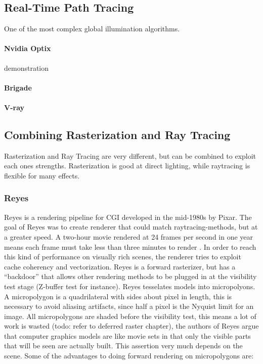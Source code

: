 \subsection {Real-Time Path Tracing}
	One of the most complex global illumination algorithms. 
	\paragraph {Nvidia Optix} demonstration
	\paragraph {Brigade} 
	\paragraph {V-ray}

\subsection {Combining Rasterization and Ray Tracing}
	Rasterization and Ray Tracing are very different, but can be combined to exploit each ones strengths. Rasterization is good at direct lighting, while raytracing is flexible for many effects.

\subsubsection {Reyes}
	\def\onequarter{\sfrac{1}{4}}
  \def\onehalf{\sfrac{1}{2}}
  
	Reyes is a rendering pipeline for CGI developed in the mid-1980s by Pixar. The goal of Reyes was to create renderer that could match raytracing-methods, but at a greater speed. A two-hour movie rendered at 24 frames per second in one year means each frame must take less than three minutes to render \cite{reyes1987}. In order to reach this kind of performance on visually rich scenes, the renderer tries to exploit cache coherency and vectorization. Reyes is a forward rasterizer, but has a ``backdoor'' that allows other rendering methods to be plugged in at the visibility test stage (Z-buffer test for instance). Reyes tesselates models into micropolyons. A micropolygon is a quadrilateral with sides about \onehalf pixel in length, this is necessary to avoid aliasing artifacts, since half a pixel is the Nyquist limit for an image. All micropolygons are shaded before the visibility test, this means a lot of work is wasted (todo: refer to deferred raster chapter), the authors of Reyes argue that computer graphics models are like movie sets in that only the visible parts that will be seen are actually built. This assertion very much depends on the scene. Some of the advantages to doing forward rendering on micropolygons are:
	
